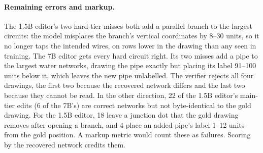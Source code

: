 {\paragraph{Remaining errors and markup.} The 1.5B editor's two hard-tier misses both add a parallel branch to the
largest circuits: the model misplaces the branch's vertical coordinates by 8--30 units, so it no longer taps the
intended wires, on rows lower in the drawing than any seen in training. The 7B editor gets every hard circuit
right. Its two misses add a pipe to the largest water networks, drawing the pipe exactly but placing its label
91--100 units below it, which leaves the new pipe unlabelled. The verifier rejects all four drawings, the first two
because the recovered network differs and the last two because they cannot be read. In the other direction, 22 of
the 1.5B editor's main-tier edits (6 of the 7B's) are correct networks but not byte-identical to the gold drawing.
For the 1.5B editor, 18 leave a junction dot that the gold drawing removes after opening a branch, and 4 place an
added pipe's label 1--12 units from the gold position. A markup metric would
count these as failures. Scoring by the recovered network credits them.}

\newcommand{\costDiscussion}{%
An \astra answer costs \$\astraMainCost{} (main tier) to \$\astraHardCost{} (hard tier) at list price and takes
a median of \astraMainSeconds{}\,s to \astraHardSeconds{}\,s. Our 1.5B editor trains in \trainMinutesOneFivePos{}
minutes on one RTX PRO 6000 GPU and then needs \gpuSecondsPerEditOneFivePos{}\,s of GPU time per edit when batched
sixteen at a time. The id-addressed run shared the GPU with another user's jobs, which stretched its training to
\trainMinutesOneFive{} minutes and inference to \gpuSecondsPerEditOneFive{}\,s per edit. The 7B editor trains in
\trainMinutesSeven{} minutes on one H100 NVL and needs \gpuSecondsPerEditSeven{}\,s per edit. The verifier needs a median of
\verifierMsMain{}\,ms (main) and \verifierMsHard{}\,ms (hard) of laptop CPU time per drawing to recover, solve,
check and compare it. It is cheap enough to run on every edit from any source, including \astra's.}

\newcommand{\conclusionOurs}{A 1.5B editor that names elements by identifier, paired with the verifier, matches
\astra's edits on the tasks both attempted. It is correct on all 1{,}000 main-tier and \editOneFiveHard\,\% of
unseen hard-tier edits, its verdicts are exact by construction, and it runs locally in about a second per edit.}

\newcommand{\abstractOurs}{A 1.5B editor that addresses elements by identifier, paired with the verifier, is correct on
all 1{,}000 held-out edits and \editOneFiveHard\,\% of the larger unseen networks, at about a second of GPU time per edit.}
